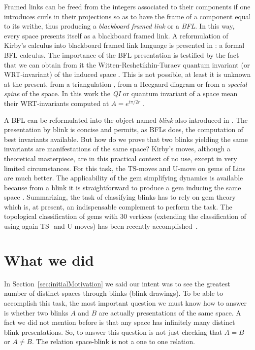 Framed links can be freed from the integers associated to their
components if one introduces curls in their projections so as to
have the frame of a component equal to its writhe, thus producing a
{\em blackboard framed link} or a {\em BFL}. In this way, every
space presents itself as a blackboard framed link. A reformulation
of Kirby's calculus into blackboard framed link language is presented
in \cite{Kauffman1991}: a formal BFL calculus. The importance of the
BFL presentation is
testified by the fact that we can obtain from
it the Witten-Reshetikhin-Turaev quantum invariant (or WRT-invariant) of
the induced space \cite{Witten1989,ReshetikhinAndTuraev1991}. This is
not possible, at least it is unknown at the present, from a
triangulation \cite{Hempel1976}, from a Heegaard diagram
\cite{Rolfsen1976} or from a {\em special spine} \cite{Matveev2003}
of the space. In this work the {\em QI} or quantum invariant of a
space mean their WRT-invariants computed at $A=e^{i\pi/2r}$
\cite{KauffmanAndLins1994}.

A BFL can be reformulated into the object named {\it blink} also
introduced in \cite{KauffmanAndLins1994}. The presentation by blink
is concise and permits, as BFLs does, the computation of best invariants
available. But how do we prove that two blinks yielding the same
invariants are manifestations of the same space? Kirby's moves, although a
theoretical masterpiece, are in this practical context of no use,
except in very limited circumstances. For this task, the TS-moves
and U-move on gems of Lins \cite{Lins1995} are much better. The
applicability of the gem simplifying dynamics is available because
from a blink it is straightforward to produce a gem inducing the
same space \cite{KauffmanAndLins1994}. Summarizing, the task of
classifying blinks has to rely on gem theory which is, at present,
an indispensable complement to perform the task. The topological
classification of gems with 30 vertices (extending the classification
of \cite{Lins1995} using again TS- and U-moves) has been recently
accomplished~\cite{CasaliCrist2006}.

\newpage

\section{What we did}

In Section~\ref{sec:initialMotivation} we said our intent was to see
the greatest number of distinct spaces through blinks (\ie blink drawings).
To be able to accomplish this task, the most important question we must know
how to answer is whether two blinks $A$ and $B$ are
actually presentations of the same space. A fact we did
not mention before is that any space has infinitely
many distinct blink presentations. So, to answer this question is
not just checking that $A = B$ or $A \neq B$. The relation
space-blink is not a one to one relation.

